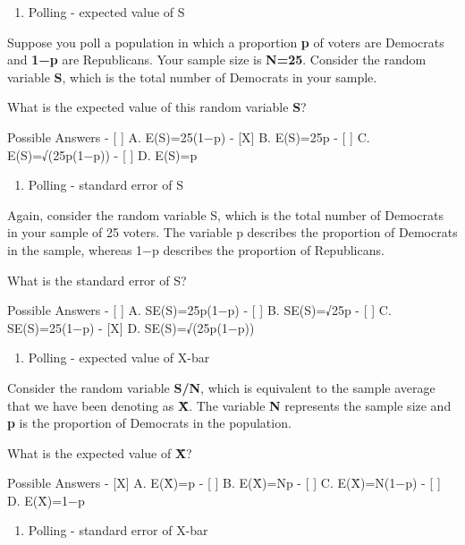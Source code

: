 \documentclass[
]{article}
\providecommand{\tightlist}{%
  \setlength{\itemsep}{0pt}\setlength{\parskip}{0pt}}
\begin{document}
\begin{enumerate}
\def\labelenumi{\arabic{enumi}.}
\tightlist
\item
  Polling - expected value of S
\end{enumerate}

Suppose you poll a population in which a proportion \textbf{p} of voters
are Democrats and \textbf{1−p} are Republicans. Your sample size is
\textbf{N=25}. Consider the random variable \textbf{S}, which is the
total number of Democrats in your sample.

What is the expected value of this random variable \textbf{S}?

Possible Answers - {[} {]} A. E(S)=25(1−p) - {[}X{]} B. E(S)=25p - {[}
{]} C. E(S)=√(25p(1−p)) - {[} {]} D. E(S)=p

\begin{enumerate}
\def\labelenumi{\arabic{enumi}.}
\setcounter{enumi}{1}
\tightlist
\item
  Polling - standard error of S
\end{enumerate}

Again, consider the random variable S, which is the total number of
Democrats in your sample of 25 voters. The variable p describes the
proportion of Democrats in the sample, whereas 1−p describes the
proportion of Republicans.

What is the standard error of S?

Possible Answers - {[} {]} A. SE(S)=25p(1−p) - {[} {]} B. SE(S)=√25p -
{[} {]} C. SE(S)=25(1−p) - {[}X{]} D. SE(S)=√(25p(1−p))

\begin{enumerate}
\def\labelenumi{\arabic{enumi}.}
\setcounter{enumi}{2}
\tightlist
\item
  Polling - expected value of X-bar
\end{enumerate}

Consider the random variable \textbf{S/N}, which is equivalent to the
sample average that we have been denoting as \textbf{X̄}. The variable
\textbf{N} represents the sample size and \textbf{p} is the proportion
of Democrats in the population.

What is the expected value of \textbf{X̄}?

Possible Answers - {[}X{]} A. E(X̄)=p - {[} {]} B. E(X̄)=Np - {[} {]} C.
E(X̄)=N(1−p) - {[} {]} D. E(X̄)=1−p

\begin{enumerate}
\def\labelenumi{\arabic{enumi}.}
\setcounter{enumi}{3}
\tightlist
\item
  Polling - standard error of X-bar
\end{enumerate}
\end{document}
